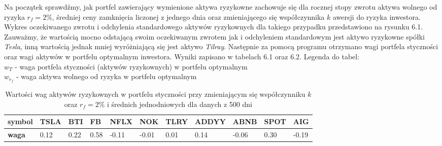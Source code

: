 \documentclass[magister]{dyplom}
\begin{document}
Na początek sprawdźmy, jak portfel zawierający wymienione aktywa ryzykowne zachowuje się dla rocznej stopy zwrotu aktywa wolnego od ryzyka $r_f = 2\%$, średniej ceny zamknięcia liczonej z jednego dnia oraz zmieniającego się współczynnika $k$ awersji do ryzyka inwestora. Wykres oczekiwanego zwrotu i odchylenia standardowego aktywów ryzykownych dla takiego przypadku przedstawiono na rysunku 6.1.
Zauważmy, że wartością mocno odstającą swoim oczekiwanym zwrotem jak i odchyleniem standardowym jest aktywo ryzykowne spółki \textit{Tesla}, inną wartością jednak mniej wyróżniającą się jest aktywo \textit{Tilray}.
Następnie za pomocą programu otrzymano wagi portfela styczności oraz wagi aktywów w portfelu optymalnym inwestora. Wyniki zapisano w tabelach 6.1 oraz 6.2.\newline
Legenda do tabel:\\
$w_T$ - waga portfela styczności (aktywów ryzykownych) w portfelu optymalnym\\
$w_{r_f}$ - waga aktywa wolnego od ryzyka w portfelu optymalnym\\
\begin{table}[ht]
	\centering
	\caption{Wartości wag aktywów ryzykownych w portfelu styczności przy zmieniającym się współczynniku $k$ oraz $r_f = 2\%$ i średnich jednodniowych dla danych z 500 dni}
	\begin{tabular}{|l|l|l|l|l|l|l|l|l|l|l|}
		\hline
		\textbf{symbol} & \textbf{TSLA} & \textbf{BTI} & \textbf{FB} & \textbf{NFLX} & \textbf{NOK} & \textbf{TLRY} & \textbf{ADDYY} & \textbf{ABNB} & \textbf{SPOT} & \textbf{AIG} \\ \hline
		\textbf{waga}   & 0.12       & 0.22          & 0.58           & -0.11        & -0.01         & 0.01         & 0.14        & -0.06          & 0.30          & -0.19        \\ \hline
	\end{tabular}
\end{table}
\end{document}
